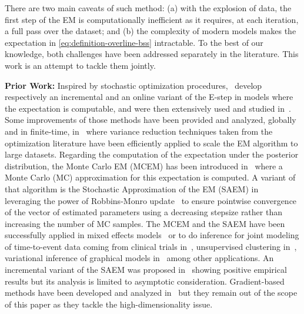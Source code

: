 \documentclass[journal, 11pt]{IEEEtran}
\begin{document}
There are two main caveats of such method: {\sf(a)} with the explosion of data, the first step of the EM is computationally inefficient as it requires, at each iteration, a full pass over the dataset; and {\sf(b)} the complexity of modern models makes the expectation in \eqref{eq:definition-overline-bss} intractable. 
To the best of our knowledge, both challenges have been addressed separately in the literature. 
This work is an attempt to tackle them jointly.

\vspace{0.08in}
\noindent \textbf{Prior Work:} Inspired by stochastic optimization procedures,~\cite{neal1998view,cappe2009line} develop respectively an incremental and an online variant of the \textsf{E-step} in models where the expectation is computable, and were then extensively used and studied in~\cite{nguyen2020mini, liang2009online,cappe2011online}.
Some improvements of those methods have been provided and analyzed, globally and in finite-time, in~\cite{karimi2019global} where variance reduction techniques taken from the optimization literature have been efficiently applied to scale the EM algorithm to large datasets.
Regarding the computation of the expectation under the posterior distribution, the Monte Carlo EM (MCEM) has been introduced in~\cite{wei1990monte} where a Monte Carlo (MC) approximation for this expectation is computed. A variant of that algorithm is the Stochastic Approximation of the EM (SAEM) in~\cite{delyon1999} leveraging the power of Robbins-Monro update~\cite{robbins1951stochastic} to ensure pointwise convergence of the vector of estimated parameters using a decreasing stepsize rather than increasing the number of MC samples.
The MCEM and the SAEM have been successfully applied in mixed effects models~\cite{mcculloch1997maximum,hughes1999mixed,baey2016nonlinear} or to do inference for joint modeling of time-to-event data coming from clinical trials in~\cite{das2010Inferences}, unsupervised clustering in~\cite{ngChoice2003}, variational inference of graphical models in~\cite{BleiVariational2017} among other applications.
An incremental variant of the SAEM was proposed in~\cite{kuhn2019properties} showing positive empirical results but its analysis is limited to asymptotic consideration. 
Gradient-based methods have been developed and analyzed in~\cite{zhu2017high} but they remain out of the scope of this paper as they tackle the high-dimensionality issue.
\end{document}
